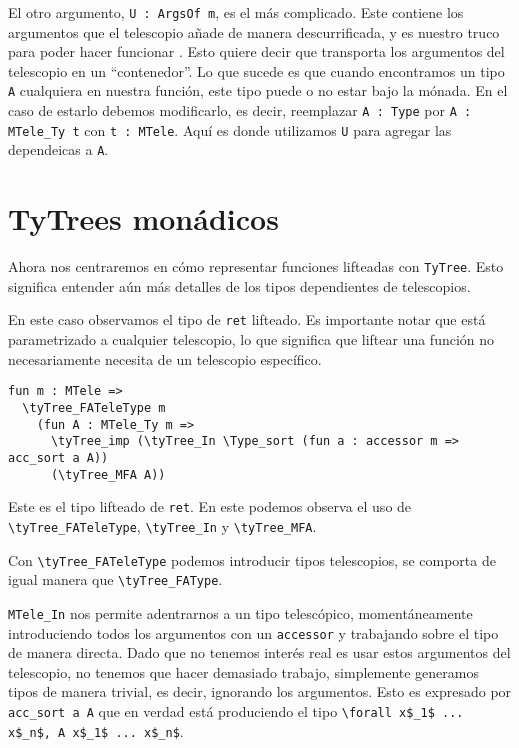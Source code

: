 El otro argumento, \lstinline{U : ArgsOf m}, es el más complicado.
Este contiene los argumentos que el telescopio añade de manera descurrificada, y es nuestro truco para poder hacer funcionar \lift.
Esto quiere decir que transporta los argumentos del telescopio en un ``contenedor''.
Lo que sucede es que cuando encontramos un tipo \lstinline{A} cualquiera en nuestra función, este tipo puede o no estar bajo la mónada.
En el caso de estarlo debemos modificarlo, es decir, reemplazar \lstinline{A : Type} por \lstinline{A : MTele_Ty t} con \lstinline{t : MTele}.
Aquí es donde utilizamos \lstinline{U} para agregar las dependeicas a \lstinline{A}.

\section{TyTrees monádicos}

Ahora nos centraremos en cómo representar funciones lifteadas con \lstinline{TyTree}.
Esto significa entender aún más detalles de los tipos dependientes de telescopios.

En este caso observamos el tipo de \lstinline{ret} lifteado.
Es importante notar que está parametrizado a cualquier telescopio, lo que significa que liftear una función no necesariamente necesita de un telescopio específico.

\begin{lstlisting}
fun m : MTele =>
  \tyTree_FATeleType m
    (fun A : MTele_Ty m =>
      \tyTree_imp (\tyTree_In \Type_sort (fun a : accessor m => acc_sort a A))
      (\tyTree_MFA A))
\end{lstlisting}

Este es el tipo lifteado de \lstinline{ret}.
En este podemos observa el uso de \lstinline{\tyTree_FATeleType}, \lstinline{\tyTree_In} y \lstinline{\tyTree_MFA}.

Con \lstinline{\tyTree_FATeleType} podemos introducir tipos telescopios, se comporta de igual manera que \lstinline{\tyTree_FAType}.

\lstinline{MTele_In} nos permite adentrarnos a un tipo telescópico, momentáneamente introduciendo todos los argumentos con un \lstinline{accessor} y trabajando sobre el tipo de manera directa.
Dado que no tenemos interés real es usar estos argumentos del telescopio, no tenemos que hacer demasiado trabajo, simplemente generamos tipos de manera trivial, es decir, ignorando los argumentos. Esto es expresado por \lstinline{acc_sort a A} que en verdad está produciendo el tipo \lstinline{\forall x$_1$ ... x$_n$, A x$_1$ ... x$_n$}.

